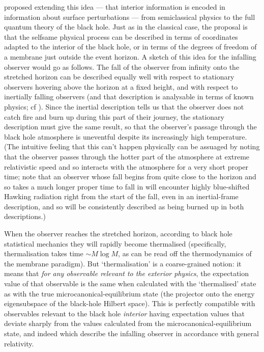\documentclass[12pt]{article}
\begin{document}
 proposed extending this idea --- that interior information is encoded in information about surface perturbations --- from semiclassical physics to the full quantum theory of the black hole. Just as in the classical case, the proposal is that the selfsame physical process can be described in terms of coordinates adapted to the interior of the black hole, or in terms of the degrees of freedom of a membrane just outside the event horizon. A sketch of this idea for the infalling observer would go as follows. The fall of the observer from infinity onto the stretched horizon can be described equally well with respect to stationary observers hovering above the horizon at a fixed height, and with respect to inertially falling observers (and that description is analysable in terms of known physics; cf ). Since the inertial description tells us that the observer does not catch fire and burn up during this part of their journey, the stationary description must give the same result, so that the observer's passage through the black hole atmosphere is uneventful despite its increasingly high temperature. (The intuitive feeling that this can't happen physically can be assuaged by noting that the observer passes through the hotter part of the atmosphere at extreme relativistic speed and so interacts with the atmosphere for a very short proper time; note that an observer whose fall begins from quite close to the horizon and so takes a much longer proper time to fall in will encounter highly blue-shifted Hawking radiation right from the start of the fall, even in an inertial-frame description, and so will be consistently described as being burned up in both descriptions.)

When the observer reaches the stretched horizon, according to black hole statistical mechanics they will rapidly become thermalised (specifically, thermalisation takes time $\sim M \log M$, as can be read off the thermodynamics of the membrane paradigm). But `thermalisation' is a coarse-grained notion: it means that \emph{for any observable relevant to the exterior physics}, the expectation value of that observable is the same  when calculated with the `thermalised' state as with the true microcanonical-equilibrium state (the projector onto the energy eigensubspace of the black-hole Hilbert space). This is perfectly compatible with observables relevant to the black hole \emph{interior} having expectation values that deviate sharply from the values calculated from the microcanonical-equilibrium state, and indeed which describe the infalling observer in accordance with general relativity.
\end{document}
